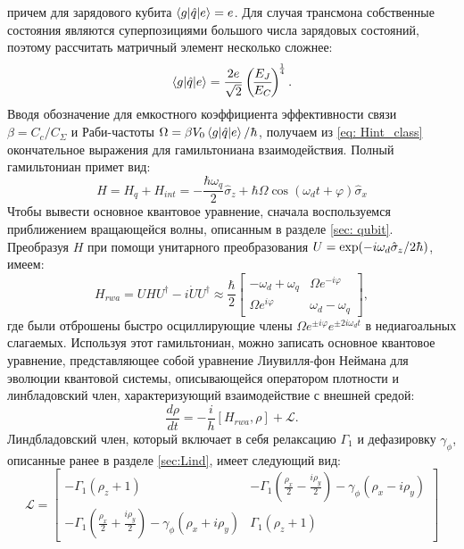 причем для зарядового кубита $\braket{g|\hat{q}|e} = e$. Для случая трансмона \cite{koch2007charge} собственные состояния являются суперпозициями большого числа зарядовых состояний, поэтому рассчитать матричный элемент несколько сложнее: 
\begin{equation}
\braket{g|\hat{q}|e} = \frac{2e}{\sqrt{2}}\left(\!\frac{E_J}{E_C}\!\right)^{\!\frac{1}{4}}.
\end{equation}
Вводя обозначение для емкостного коэффициента эффективности связи  $\beta = C_c/C_\Sigma$ и Раби-частоты $\Omega = \beta V_0\braket{g|\hat{q}|e}/\hbar$, получаем из \eqref{eq: Hint_class} окончательное выражения для гамильтониана взаимодействия. Полный гамильтониан примет вид:
\begin{equation}
H = H_q + H_{int} = -\frac{\hbar \omega_q}{2}\hat{\sigma}_z+ \hbar\Omega\cos(\omega_d t + \varphi)\hat{\sigma}_x
\label{eq: H_int_class_final}
\end{equation} 
Чтобы вывести основное квантовое уравнение, сначала воспользуемся приближением вращающейся волны, описанным в разделе \ref{sec: qubit}. Преобразуя $H$ при помощи унитарного преобразования $U=\exp(-i\omega_d\sz/2\hbar)$, имеем:
\begin{equation}
\label{eq: Hrot}
H_{rwa}=UHU^\dagger-i\dot{U}U^\dag \approx \frac{\hbar}{2}\left[\begin{matrix}- \omega_d + \omega_q & \Omega e^{- i \varphi}\\\Omega e^{i \varphi}  & \omega_d - \omega_q\end{matrix}\right],
\end{equation}
где были отброшены быстро осциллирующие члены $\Omega e^{\pm i \varphi} e^{\pm2 i \omega_d t}$ в недиагоальных слагаемых. Используя этот гамильтониан, можно записать основное квантовое уравнение, представляющее собой уравнение Лиувилля-фон Неймана для эволюции квантовой системы, описывающейся оператором плотности и линбладовский член, характеризующий взаимодействие с внешней средой:
\begin{equation}
\frac{d\rho}{dt} = -\frac{i}{h}[H_{rwa}, \rho] + \mathcal{L}.
\label{eq: QLiouv}
\end{equation}
Линдбладовский член, который включает в себя релаксацию $\Gamma_1$ и дефазировку $\gamma_\phi$, описанные ранее в разделе \ref{sec:Lind}, имеет следующий вид:
\begin{equation}
\mathcal{L} = \left[\begin{matrix}-\Gamma_1 \left(\rho_{z}+1\right) & -\Gamma_1 \left( \frac{\rho_{x}}{2}-\frac{i \rho_{y}}{2}\right) - \gamma_{\phi} \left(\rho_{x} - i \rho_{y}\right)\\-\Gamma_1 \left( \frac{\rho_{x}}{2} + \frac{i \rho_{y}}{2}\right) - \gamma_{\phi} \left(\rho_{x} + i \rho_{y}\right) & \Gamma_1 \left(\rho_{z} + 1\right)\end{matrix}\right]
\end{equation}
